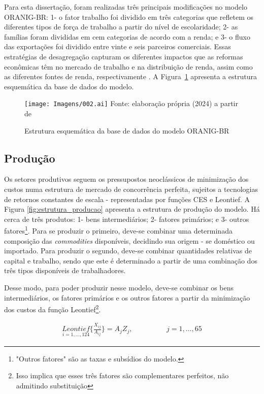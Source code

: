 Para esta dissertação, foram realizadas três principais modificações no modelo ORANIG-BR: 1- o fator trabalho foi dividido em três categorias que refletem os diferentes tipos de força de trabalho a partir do nível de escolaridade; 2- as famílias foram divididas em cem categorias de acordo com a renda; e 3- o fluxo das exportações foi dividido entre vinte e seis parceiros comerciais. Essas estratégias de desagregação capturam os diferentes impactos que as reformas econômicas têm no mercado de trabalho e na distribuição de renda, assim como as diferentes fontes de renda, respectivamente \cite{carneiro06}. A Figura~\ref{fig:estrutura_orani} apresenta a estrutura esquemática da base de dados do modelo.

\begin{figure}
	\centering
	\caption{Estrutura esquemática da base de dados do modelo ORANIG-BR} \label{fig:estrutura_orani}
	\texttt{[image: Imagens/002.ai]}
	\footnotesize
	Fonte: elaboração própria (2024) a partir de \textcite{horridge00}
\end{figure}


\subsection{Produção} \label{subsec:producao}

Os setores produtivos seguem os pressupostos neoclássicos de minimização dos custos numa estrutura de mercado de concorrência perfeita, sujeitos a tecnologias de retornos constantes de escala - representadas por funções CES e Leontief. A Figura \ref{fig:estrutura_producao} apresenta a estrutura de produção do modelo. Há cerca de três produtos: 1- bens intermediários; 2- fatores primários; e 3- outros fatores\footnote{"Outros fatores" são as taxas e subsídios do modelo.}. Para se produzir o primeiro, deve-se combinar uma determinada composição das \textit{commodities} disponíveis, decidindo sua origem - se doméstico ou importado. Para produzir o segundo, deve-se combinar quantidades relativas de capital e trabalho, sendo que este é determinado a partir de uma combinação dos três tipos disponíveis de trabalhadores.

Desse modo, para poder produzir nesse modelo, deve-se combinar os bens intermediários, os fatores primários e os outros fatores a partir da minimização dos custos da função Leontief\footnote{Isso implica que esses três fatores são complementares perfeitos, não admitindo substituição}.

\begin{align}
	\underset{i = 1, ... , 124}{Leontief} \{\frac{X_{ij}}{A_{ij}}\} = A_jZ_j, \hspace{2cm} j = 1, ... , 65
\end{align}

